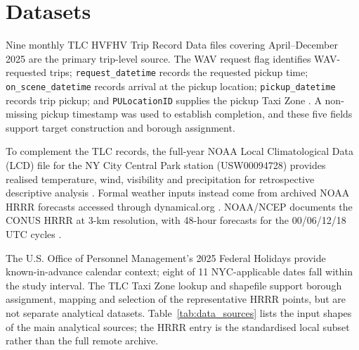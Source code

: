 \documentclass[11pt]{article}
\begin{document}
\section{Datasets}
Nine monthly TLC HVFHV Trip Record Data files \cite{nyctlc_trip_records}
covering April--December 2025 are the primary trip-level source. The WAV request flag
identifies WAV-requested trips; \texttt{request\_datetime} records the requested pickup time;
\texttt{on\_scene\_datetime} records arrival at the pickup location;
\texttt{pickup\_datetime} records trip pickup; and \texttt{PULocationID}
supplies the pickup Taxi Zone \cite{nyctlc_hvfhv_dictionary}. A non-missing
pickup timestamp was used to establish completion, and these five fields
support target construction and borough assignment.

To complement the TLC records, the full-year NOAA Local Climatological Data
(LCD) file for the NY City Central Park station (USW00094728) provides realised
temperature, wind, visibility and precipitation for retrospective descriptive
analysis \cite{noaa_lcd}. Formal weather inputs instead come from archived NOAA
HRRR forecasts accessed through dynamical.org \cite{dynamical_hrrr}. NOAA/NCEP
documents the CONUS HRRR at 3-km resolution, with 48-hour forecasts for the
00/06/12/18 UTC cycles \cite{noaa_hrrr}.

The U.S. Office of Personnel Management's 2025 Federal Holidays
\cite{opm_holidays} provide known-in-advance calendar context; eight of 11
NYC-applicable dates fall within the study interval. The TLC Taxi Zone lookup
and shapefile \cite{nyctlc_taxi_zones} support borough assignment, mapping and
selection of the representative HRRR points, but are not separate analytical
datasets. Table~\ref{tab:data_sources} lists the input shapes of the main
analytical sources; the HRRR entry is the standardised local subset rather than
the full remote archive.
\end{document}

